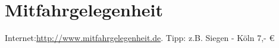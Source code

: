 \section{Mitfahrgelegenheit}
Internet:\href{http://www.mitfahrgelegenheit.de}{http://www.mitfahrgelegenheit.de}. Tipp: z.B. Siegen - Köln 7,- \euro
